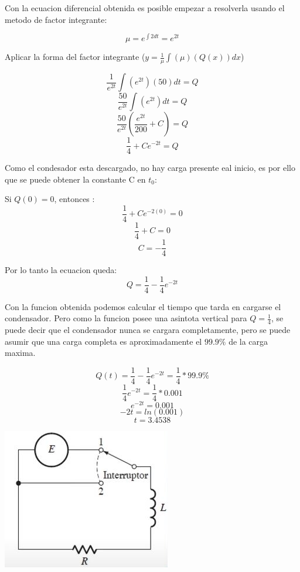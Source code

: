    Con la ecuacion diferencial obtenida es posible empezar a resolverla usando el metodo de factor integrante:

    $$ \mu = e^{\int 2 dt} = e^{2t} $$

    Aplicar la forma del factor integrante ($ y = \frac{1}{\mu} \int{(\mu)(Q(x))}dx  $)

    $$ \frac{1}{e^{2t}} \int{(e^{2t})(50)}dt  = Q$$
    $$ \frac{50}{e^{2t}} \int(e^{2t}) dt = Q$$
    $$ \frac{50}{e^{2t}} (\frac{e^{2t}}{200} + C) = Q$$
    $$ \frac{1}{4} + Ce^{-2t} = Q$$


    Como el condesador esta descargado, no hay carga presente eal inicio, es por ello que se puede obtener la constante C en
    $t_0$:

    Si $Q(0) = 0$, entonces :
    $$ \frac{1}{4} + Ce^{-2(0)} = 0 $$
    $$ \frac{1}{4} + C = 0 $$
    $$ C = -\frac{1}{4} $$


    Por lo tanto la ecuacion queda:
    $$ Q = \frac{1}{4} - \frac{1}{4}e^{-2t} $$

    Con la funcion obtenida podemos calcular el tiempo que tarda en cargarse el condensador. Pero como la funcion 
    posee una asintota vertical para $Q = \frac{1}{4}$, se puede decir que el condensador nunca se cargara completamente, pero
    se puede asumir que una carga completa es aproximadamente el $99.9\%$ de la carga maxima.
    
    $$ Q(t) = \frac{1}{4} - \frac{1}{4}e^{-2t} = \frac{1}{4} * 99.9\% $$
    $$ \frac{1}{4}e^{-2t} = \frac{1}{4} * 0.001 $$
    $$ e^{-2t} = 0.001 $$
    $$ -2t = ln(0.001) $$
    $$ t = 3.4538$$


    \begin{center}
        \includegraphics[scale=1]{chapters/2/images/ej3.jpg}   
    \end{center}

